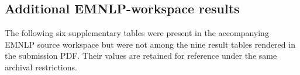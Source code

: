 

\clearpage

\clearpage




\clearpage
\subsection{Additional EMNLP-workspace results}
\noindent The following six supplementary tables were present in the accompanying EMNLP source workspace but were not among the nine result tables rendered in the submission PDF. Their values are retained for reference under the same archival restrictions.


\clearpage





